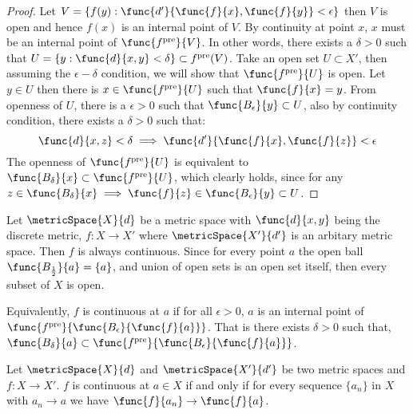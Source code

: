 \begin{proof}
    Let \(V = \{ f(y) :\func{d'}{\func{f}{x},\func{f}{y}} < \epsilon\}\) then \(V\) is open and hence \(f(x)\) is an internal point of \(V\). By continuity at point \(x\), \(x\) must be an internal point of \(\func{f^{\mathrm{pre}}}{V}\). In other words, there exists a \(\delta > 0\) such that \(U = \{ y : \func{d}{x,y} < \delta \} \subset f^{\mathrm{pre}}(V)\).
    Take an open set \(U \subset X'\), then assuming the \(\epsilon-\delta\) condition, we will show that \(\func{f^\mathrm{pre}}{U}\) is open. Let \(y \in U\) then there is \(x \in \func{f^\mathrm{pre}}{U}\) such that \(\func{f}{x} = y\). From openness of \(U\), there is a \( \epsilon > 0\) such that \(\func{B_\epsilon}{y} \subset U\), also by continuity condition, there exists a \(\delta > 0 \) such that:
    \begin{equation*}
        \func{d}{x,z} < \delta \implies \func{d'}{\func{f}{x},\func{f}{z}} < \epsilon
    \end{equation*}
    The openness of \(\func{f^\mathrm{pre}}{U}\) is equivalent to \(\func{B_\delta}{x} \subset \func{f^\mathrm{pre}}{U}\), which clearly holds, since for any \(z \in \func{B_\delta}{x} \implies \func{f}{z} \in \func{B_\epsilon}{y} \subset U\).
\end{proof}

\begin{example}
    Let \(\metricSpace{X}{d}\) be a metric space with \(\func{d}{x,y}\) being the discrete metric, \(f : X \to X'\) where \(\metricSpace{X'}{d'}\) is an arbitary metric space. Then \(f\) is always continuous. Since for every point \(a\) the open ball \(\func{B_{\frac{1}{2}}}{a} = \{ a \}\), and union of open sets is an open set itself, then every subset of \(X\) is open.
\end{example}
Equivalently, \(f\) is continuous at \(a\) if for all \(\epsilon > 0\), \(a\) is an internal point of \(\func{f^{\mathrm{pre}}}{\func{B_\epsilon}{\func{f}{a}}}\). That is there exists \(\delta > 0\) such that, \(\func{B_\delta}{a}  \subset \func{f^{\mathrm{pre}}}{\func{B_\epsilon}{\func{f}{a}}}\).

\begin{theorem}
    Let \(\metricSpace{X}{d}\) and \(\metricSpace{X'}{d'}\) be two metric spaces and \( f: X \to X' \). \(f\) is continuous at \( a \in X\) if and only if for every sequence \(\{ a_n\}\) in \(X\) with \(a_n \to a\) we have \(\func{f}{a_n} \to \func{f}{a}\).
\end{theorem}

